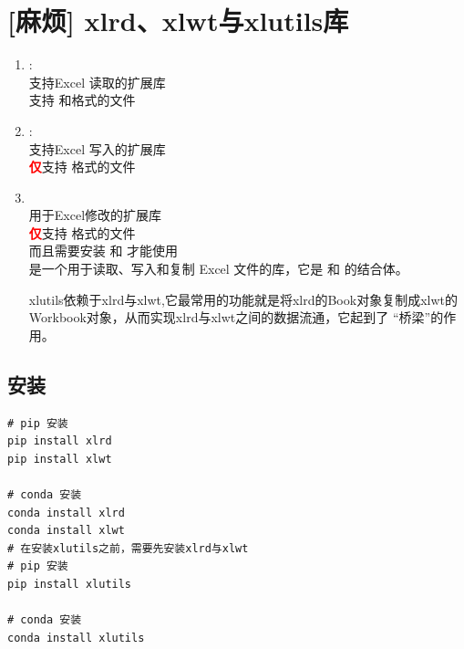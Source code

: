 \chapter{[麻烦] xlrd、xlwt与xlutils库}
\label{sec:xlrd与xlwt库}

\begin{enumerate}[label=\arabic*)]
        \item {}:\\
         支持Excel 读取的扩展库\\
         支持 和格式的文件\\

     \item {}:\\
         支持Excel 写入的扩展库\\
         \textcolor{red}{\textbf{仅}}支持 格式的文件\\
     \item {}\\
         用于Excel修改的扩展库\\
         \textcolor{red}{\textbf{仅}}支持 格式的文件\\
         而且需要安装  和  才能使用\\
         是一个用于读取、写入和复制 Excel 文件的库，它是  和  的结合体。

        xlutils依赖于xlrd与xlwt,它最常用的功能就是将xlrd的Book对象复制成xlwt的
Workbook对象，从而实现xlrd与xlwt之间的数据流通，它起到了 “桥梁”的作用。
\end{enumerate}


\section{安装}
\label{subsec:xlrd与xlwt与xlutils库安装}
\begin{lstlisting}[style=demostyle,numbers=none]
# pip 安装
pip install xlrd
pip install xlwt

# conda 安装
conda install xlrd
conda install xlwt
# 在安装xlutils之前，需要先安装xlrd与xlwt
# pip 安装
pip install xlutils

# conda 安装
conda install xlutils
\end{lstlisting}

